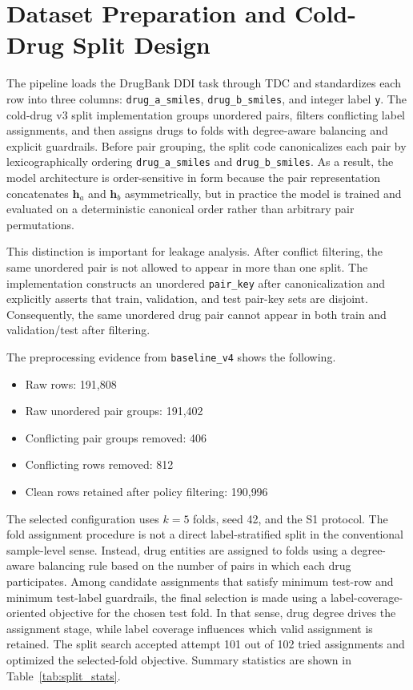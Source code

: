 \documentclass[12pt,a4paper]{report}
\begin{document}
\section{Dataset Preparation and Cold-Drug Split Design}
The pipeline loads the DrugBank DDI task through TDC and standardizes each row into three columns: \texttt{drug\_a\_smiles}, \texttt{drug\_b\_smiles}, and integer label \texttt{y}. The cold-drug v3 split implementation groups unordered pairs, filters conflicting label assignments, and then assigns drugs to folds with degree-aware balancing and explicit guardrails. Before pair grouping, the split code canonicalizes each pair by lexicographically ordering \texttt{drug\_a\_smiles} and \texttt{drug\_b\_smiles}. As a result, the model architecture is order-sensitive in form because the pair representation concatenates \(\mathbf{h}_a\) and \(\mathbf{h}_b\) asymmetrically, but in practice the model is trained and evaluated on a deterministic canonical order rather than arbitrary pair permutations.

This distinction is important for leakage analysis. After conflict filtering, the same unordered pair is not allowed to appear in more than one split. The implementation constructs an unordered \texttt{pair\_key} after canonicalization and explicitly asserts that train, validation, and test pair-key sets are disjoint. Consequently, the same unordered drug pair cannot appear in both train and validation/test after filtering.

The preprocessing evidence from \texttt{baseline\_v4} shows the following.
\begin{itemize}
  \item Raw rows: 191{,}808
  \item Raw unordered pair groups: 191{,}402
  \item Conflicting pair groups removed: 406
  \item Conflicting rows removed: 812
  \item Clean rows retained after policy filtering: 190{,}996
\end{itemize}

The selected configuration uses \(k=5\) folds, seed 42, and the S1 protocol. The fold assignment procedure is not a direct label-stratified split in the conventional sample-level sense. Instead, drug entities are assigned to folds using a degree-aware balancing rule based on the number of pairs in which each drug participates. Among candidate assignments that satisfy minimum test-row and minimum test-label guardrails, the final selection is made using a label-coverage-oriented objective for the chosen test fold. In that sense, drug degree drives the assignment stage, while label coverage influences which valid assignment is retained. The split search accepted attempt 101 out of 102 tried assignments and optimized the selected-fold objective. Summary statistics are shown in Table~\ref{tab:split_stats}.
\end{document}
